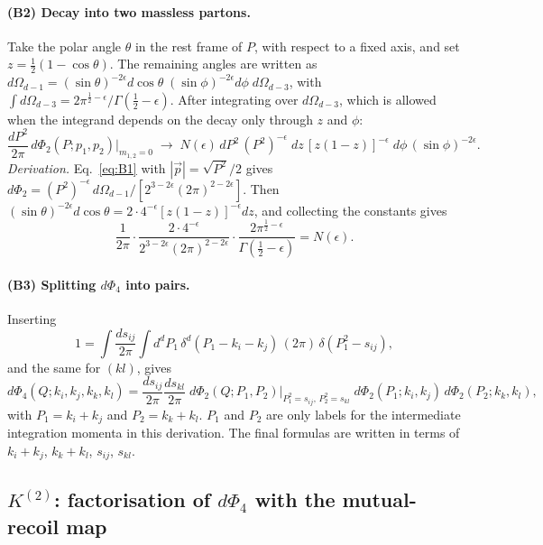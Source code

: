 \documentclass[11pt,a4paper]{article}
\newcommand{\eps}{\epsilon}
\begin{document}
\paragraph{(B2) Decay into two massless partons.} Take the polar angle $\theta$ in the rest frame of $P$, with respect to a
fixed axis, and set $z=\frac12(1-\cos\theta)$. The remaining angles are written as
$d\Omega_{d-1}=(\sin\theta)^{-2\eps}d\!\cos\theta\;(\sin\phi)^{-2\eps}d\phi\;d\Omega_{d-3}$, with $\int d\Omega_{d-3}=2\pi^{\frac12-\eps}/\Gamma(\frac12-\eps)$.
After integrating over $d\Omega_{d-3}$, which is allowed when the integrand depends on the decay only through $z$ and $\phi$:
\begin{equation}
\frac{dP^2}{2\pi}\,d\Phi_2(P;p_1,p_2)\Big|_{m_{1,2}=0}
\;\to\;N(\eps)\,dP^2\,(P^2)^{-\eps}\;dz\,[z(1-z)]^{-\eps}\;d\phi\,(\sin\phi)^{-2\eps}.
\label{eq:B2}
\end{equation}
\textit{Derivation.} Eq.~\eqref{eq:B1} with $|\vec p|=\sqrt{P^2}/2$ gives
$d\Phi_2=(P^2)^{-\eps}\,d\Omega_{d-1}/[2^{3-2\eps}(2\pi)^{2-2\eps}]$. Then
$(\sin\theta)^{-2\eps}d\!\cos\theta=2\cdot4^{-\eps}[z(1-z)]^{-\eps}dz$, and collecting the constants gives
\begin{equation}
\frac{1}{2\pi}\cdot\frac{2\cdot4^{-\eps}}{2^{3-2\eps}(2\pi)^{2-2\eps}}\cdot\frac{2\pi^{\frac12-\eps}}{\Gamma(\frac12-\eps)}=N(\eps).
\end{equation}

\paragraph{(B3) Splitting $d\Phi_4$ into pairs.} Inserting
\begin{equation}
1=\int\frac{ds_{ij}}{2\pi}\int d^dP_1\,\delta^d(P_1-k_i-k_j)\,(2\pi)\,\delta(P_1^2-s_{ij}),
\end{equation}
and the same for $(kl)$, gives
\begin{equation}
d\Phi_4(Q;k_i,k_j,k_k,k_l)=\frac{ds_{ij}}{2\pi}\frac{ds_{kl}}{2\pi}\;
d\Phi_2(Q;P_1,P_2)\Big|_{P_1^2=s_{ij},\,P_2^2=s_{kl}}\;
d\Phi_2(P_1;k_i,k_j)\,d\Phi_2(P_2;k_k,k_l),
\label{eq:B3}
\end{equation}
with $P_1=k_i+k_j$ and $P_2=k_k+k_l$. $P_1$ and $P_2$ are only labels for the intermediate integration momenta in this derivation.
The final formulas are written in terms of $k_i+k_j$, $k_k+k_l$, $s_{ij}$, $s_{kl}$.

\subsection{$K^{(2)}$: factorisation of $d\Phi_4$ with the mutual-recoil map}
\label{sec:psK2}
\end{document}
